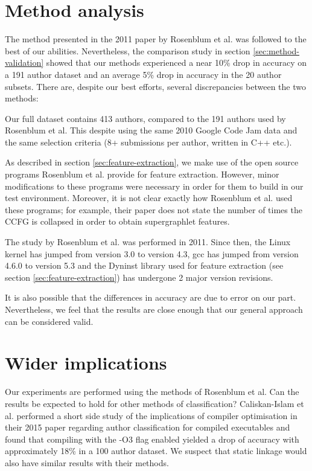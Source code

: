 \documentclass[a4paper,11pt]{kth-mag}
\begin{document}
\section{Method analysis}
The method presented in the 2011 paper by Rosenblum et al.
\parencite{rosenblum2011wrote} was followed to the best of our abilities.
Nevertheless, the comparison study in section \ref{sec:method-validation}
showed that our methods experienced a near 10\% drop in accuracy on a 191
author dataset and an average 5\% drop in accuracy in the 20 author subsets.
There are, despite our best efforts, several discrepancies between the two
methods:

\begin{description}[style=nextline]
\item[Dataset inconsistencies]
Our full dataset contains 413 authors, compared to the 191 authors used by
Rosenblum et al. This despite using the same 2010 Google Code Jam data and the
same selection criteria (8+ submissions per author, written in C++ etc.).

\item[Errors in the feature extraction process]
As described in section \ref{sec:feature-extraction}, we make use of the open
source programs Rosenblum et al. provide for feature extraction. However, minor
modifications to these programs were necessary in order for them to build in
our test environment. Moreover, it is not clear exactly how Rosenblum et al.
used these programs; for example, their paper does not state the number of
times the CCFG is collapsed in order to obtain supergraphlet features.

\item[Different testing environments]
The study by Rosenblum et al. was performed in 2011. Since then, the Linux
kernel has jumped from version 3.0 to version 4.3, gcc has jumped from version
4.6.0 to version 5.3 and the Dyninst library used for feature extraction (see
section \ref{sec:feature-extraction}) has undergone 2 major version revisions.
\end{description}

It is also possible that the differences in accuracy are due to error on our
part. Nevertheless, we feel that the results are close enough that our general
approach can be considered valid.

\section{Wider implications}
\label{sec:wider}
Our experiments are performed using the methods of Rosenblum et al. Can the
results be expected to hold for other methods of classification? Caliskan-Islam
et al. performed a short side study of the implications of compiler
optimisation in their 2015 paper regarding author classification for compiled
executables \parencite{caliskan2015coding} and found that compiling with the
-O3 flag enabled yielded a drop of accuracy with approximately 18\% in a 100
author dataset. We suspect that static linkage would also have similar results
with their methods.
\end{document}
